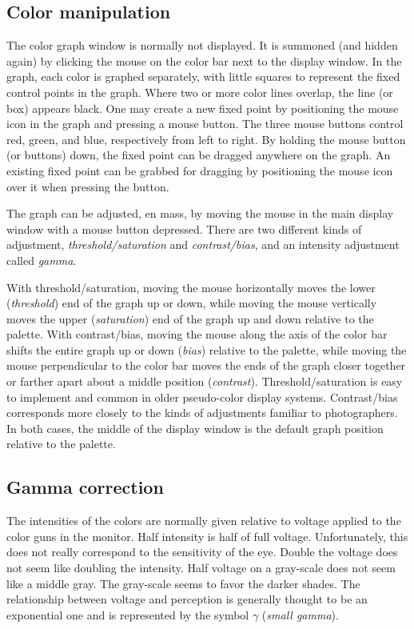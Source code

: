 \subsection{ Color manipulation }

The color graph window is normally not displayed.  It is summoned
(and hidden again) by clicking the mouse on the color bar next to the
display window.  In the graph, each color is graphed separately, with
little squares to represent the fixed control points in the graph.  Where
two or more color lines overlap, the line (or box) appears black.  One may
create a new fixed point by positioning the mouse icon in the graph and
pressing a mouse button.  The three mouse buttons control red, green,
and blue, respectively from left to right.  By holding the mouse button
(or buttons) down, the fixed point can be dragged anywhere on the graph.
An existing fixed point can be grabbed for dragging by positioning the
mouse icon over it when pressing the button.

The graph can be adjusted, en mass, by moving the mouse in the main
display window with a mouse button depressed.  There are two different
kinds of adjustment, {\em threshold/saturation} and {\em contrast/bias}, and an
intensity adjustment called {\em gamma}.

With threshold/saturation, moving the mouse horizontally moves the lower
({\em threshold}) end of the graph up or down, while moving the mouse vertically
moves the upper ({\em saturation}) end of the graph up and down relative to the
palette.   With contrast/bias, moving the mouse along the axis of the
color bar shifts the entire graph up or down ({\em bias}) relative to the
palette, while moving the mouse perpendicular to the color bar moves the
ends of the graph closer together or farther apart about a middle position
({\em contrast}).  Threshold/saturation is easy to implement and
common in older pseudo-color display systems.  Contrast/bias corresponds more
closely to the kinds of adjustments familiar to photographers.  In both
cases, the middle of the display window is the default graph position
relative to the palette.

\subsection{ Gamma correction }

The intensities of the colors are normally given relative to voltage
applied to the color guns in the monitor.  Half intensity is half of
full voltage.  Unfortunately, this does not really correspond to the
sensitivity of the eye.  Double the voltage does not seem like doubling
the intensity.  Half voltage on a gray-scale does not seem like a
middle gray.  The gray-scale seems to favor the darker shades.  The
relationship between voltage and perception is generally thought to be
an exponential one and is represented by the symbol $\gamma$ ({\em small gamma}).

